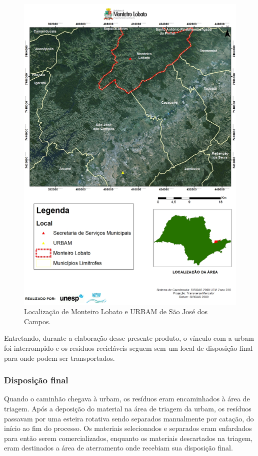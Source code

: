 \begin{figure}
	\centering
	\includegraphics[width=1\linewidth]{produtos/prodtres/image048}
	\caption{Localização de Monteiro Lobato e URBAM de São José dos Campos.}
	\label{fig:image048}
\end{figure}

Entretando,  durante a elaboração desse presente produto, o vínculo com a \gls{urbam} foi interrompido e os resíduos recicláveis seguem sem um local de disposição final para onde podem ser transportados.

\subsubsection{Disposição final}

Quando o caminhão chegava à \gls{urbam}, os resíduos eram encaminhados à área de triagem. Após a deposição do material na área de triagem da \gls{urbam}, os resíduos passavam por uma esteira rotativa sendo separados manualmente por catação, do início ao fim do processo. Os materiais selecionados e separados eram enfardados para então serem comercializados, enquanto os materiais descartados na triagem, eram destinados a área de aterramento onde recebiam sua disposição final. 

